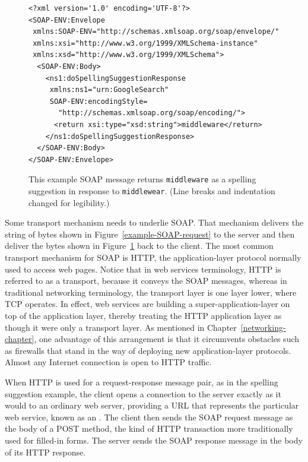 \begin{figure}
\begin{verbatim}
<?xml version='1.0' encoding='UTF-8'?>
<SOAP-ENV:Envelope
 xmlns:SOAP-ENV="http://schemas.xmlsoap.org/soap/envelope/"
 xmlns:xsi="http://www.w3.org/1999/XMLSchema-instance"
 xmlns:xsd="http://www.w3.org/1999/XMLSchema">
  <SOAP-ENV:Body>
    <ns1:doSpellingSuggestionResponse
     xmlns:ns1="urn:GoogleSearch"
     SOAP-ENV:encodingStyle=
       "http://schemas.xmlsoap.org/soap/encoding/">
      <return xsi:type="xsd:string">middleware</return>
    </ns1:doSpellingSuggestionResponse>
  </SOAP-ENV:Body>
</SOAP-ENV:Envelope>
\end{verbatim}
\caption{This example SOAP message returns {\tt middleware} as a spelling suggestion
in response to {\tt middlewear}. (Line breaks and indentation changed
for legibility.)}\label{example-SOAP-response}
\end{figure}

Some transport mechanism needs to underlie SOAP.  That mechanism delivers the
string of bytes shown in Figure~\ref{example-SOAP-request} to the
server and then deliver the bytes shown in
Figure~\ref{example-SOAP-response} back to the client.  The most
common transport mechanism for SOAP is HTTP, the application-layer
protocol normally used to access web pages.  Notice that in web
services terminology, HTTP is referred to as a transport, because it
conveys the SOAP messages, whereas in traditional networking
terminology, the transport layer is one layer lower, where TCP
operates.  In effect, web services are building a
super-application-layer on top of the application layer, thereby
treating the HTTP application layer as though it were only a transport
layer.  As mentioned in Chapter~\ref{networking-chapter}, one
advantage of this arrangement is that it circumvents obstacles such as
firewalls that stand in the way of deploying new application-layer
protocols.  Almost any Internet connection is open to HTTP traffic.

When HTTP is used for a request-response message pair, as in the
spelling suggestion example, the client opens a connection to the
server exactly as it would to an ordinary web server, providing a URL
that represents the particular web service, known as an
.  The client then sends the
SOAP request message as the body of a POST method, the kind of HTTP
transaction more traditionally used for filled-in forms.  The server
sends the SOAP response message in the body of its HTTP response.

